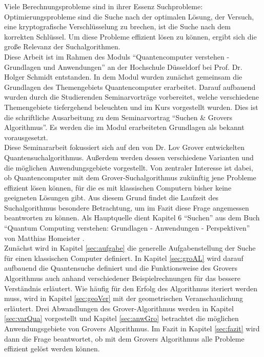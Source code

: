 Viele Berechnungsprobleme sind in ihrer Essenz Suchprobleme: Optimierungsprobleme sind die Suche nach der optimalen Lösung, der Versuch, eine kryptografische Verschlüsselung zu brechen, ist die Suche nach dem korrekten Schlüssel. Um diese Probleme effizient lösen zu können, ergibt sich die große Relevanz der Suchalgorithmen.
\\
Diese Arbeit ist im Rahmen des Moduls “Quantencomputer verstehen - Grundlagen und Anwendungen” an der Hochschule Düsseldorf bei Prof. Dr. Holger Schmidt entstanden. In dem Modul wurden zunächst gemeinsam die Grundlagen des Themengebiets Quantencomputer erarbeitet. Darauf aufbauend wurden durch die Studierenden Seminarvorträge vorbereitet, welche verschiedene Themengebiete tiefergehend beleuchten und im Kurs vorgestellt wurden. Dies ist die schriftliche Ausarbeitung zu dem Seminarvortrag “Suchen \& Grovers Algorithmus”. Es werden die im Modul erarbeiteten Grundlagen als bekannt vorausgesetzt.
\newline
\\
Diese Seminararbeit fokussiert sich auf den von Dr. Lov Grover entwickelten Quantensuchalgorithmus. Außerdem werden dessen verschiedene Varianten und die möglichen Anwendungsgebiete vorgestellt.
Von zentraler Interesse ist dabei, ob Quantencomputer mit dem Grover-Suchalgorithmus zukünftig jene Probleme effizient lösen können, für die es mit klassischen Computern bisher keine geeigneten Lösungen gibt. 
Aus diesem Grund findet die Laufzeit des Suchalgorithmus besondere Betrachtung, um im Fazit diese Frage angemessen beantworten zu können. 
Als Hauptquelle dient Kapitel 6 “Suchen” aus dem Buch “Quantum Computing verstehen: Grundlagen - Anwendungen - Perspektiven” von Matthias Homeister \cite[S. 137 - 167]{Ho17}.
\newline
\\
Zunächst wird in Kapitel \ref{sec:aufgabe} die generelle Aufgabenstellung der Suche für einen klassischen Computer definiert.
In Kapitel \ref{sec:groAL} wird darauf aufbauend die Quantensuche definiert und die Funktionsweise des Grovers Algorithmus auch anhand verschiedener Beispielrechnungen für das bessere Verständnis erläutert.
Wie häufig für den Erfolg des Algorithmus iteriert werden muss, wird in Kapitel \ref{sec:geoVer} mit der geometrischen Veranschaulichung erläutert.
Drei Abwandlungen des Grover-Algorithmus werden in Kapitel \ref{sec:varQua} vorgestellt und Kapitel \ref{sec:anwGro} betrachtet die möglichen Anwendungsgebiete von Grovers Algorithmus.
Im Fazit in Kapitel \ref{sec:fazit} wird dann die Frage beantwortet, ob mit dem Grovers Algorithmus alle Probleme effizient gelöst werden können.